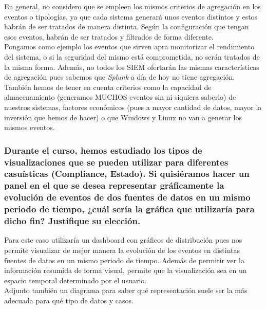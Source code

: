 \documentclass[12pt,twoside]{article}
\begin{document}
En general, no considero que se empleen los mismos criterios de agregación en los eventos o tipologías, ya que cada sistema generará unos eventos distintos y estos habrán de ser tratados de manera distinta. Según la configuración que tengan esos eventos, habrán de ser tratados y filtrados de forma diferente.\\
Pongamos como ejemplo los eventos que sirven apra monitorizar el rendimiento del sistema, o si la seguridad del mismo está comprometida, no serán tratados de la misma forma. Además, no todos los SIEM ofertarán las mismas características de agregación pues sabemos que \textit{Splunk} a día de hoy no tiene agregación.\\
También hemos de tener en cuenta criterios como la capacidad de almacenamiento (generamos MUCHOS eventos sin ni siquiera saberlo) de nuestros sistemas, factores económicos (pues a mayor cantidad de datos, mayor la inversión que hemos de hacer) o que Windows y Linux no van a generar los mismos eventos. 

\subsubsection*{Durante el curso, hemos estudiado los tipos de visualizaciones que se pueden utilizar para diferentes casuísticas (Compliance, Estado). Si quisiéramos hacer un panel en el que se desea representar gráficamente la evolución de eventos de dos fuentes de datos en un mismo periodo de tiempo, ¿cuál sería la gráfica que utilizaría para dicho fin? Justifique su elección.}

Para este caso utilizaría un dashboard con gráficos de distribución pues nos permite visualizar de mejor manera la evolución de los eventos en distintas fuentes de datos en un mismo periodo de tiempo. Además de permitir ver la información resumida de forma visual, permite que la visualización sea en un espacio temporal determinado por el usuario.\\ 
Adjunto también un diagrama para saber qué representación suele ser la más adecuada para qué tipo de datos y casos.
\end{document}
